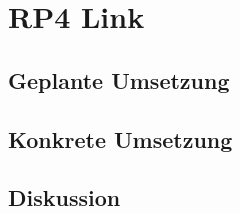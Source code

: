 \section{RP4 Link}
\label{sec:principle-rp4-link}

\subsection*{Geplante Umsetzung}


\subsection*{Konkrete Umsetzung}


\subsection*{Diskussion}
